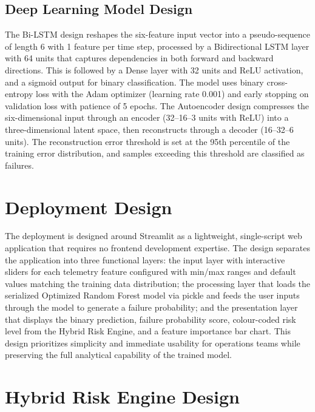 \documentclass[12pt,letterpaper]{report}
\begin{document}
\subsection{Deep Learning Model Design}

The Bi-LSTM design reshapes the six-feature input vector into a pseudo-sequence of length 6 with 1 feature per time step, processed by a Bidirectional LSTM layer with 64 units that captures dependencies in both forward and backward directions. This is followed by a Dense layer with 32 units and ReLU activation, and a sigmoid output for binary classification. The model uses binary cross-entropy loss with the Adam optimizer (learning rate 0.001) and early stopping on validation loss with patience of 5 epochs. The Autoencoder design compresses the six-dimensional input through an encoder (32--16--3 units with ReLU) into a three-dimensional latent space, then reconstructs through a decoder (16--32--6 units). The reconstruction error threshold is set at the 95th percentile of the training error distribution, and samples exceeding this threshold are classified as failures.

\section{Deployment Design}

The deployment is designed around Streamlit as a lightweight, single-script web application that requires no frontend development expertise. The design separates the application into three functional layers: the input layer with interactive sliders for each telemetry feature configured with min/max ranges and default values matching the training data distribution; the processing layer that loads the serialized Optimized Random Forest model via pickle and feeds the user inputs through the model to generate a failure probability; and the presentation layer that displays the binary prediction, failure probability score, colour-coded risk level from the Hybrid Risk Engine, and a feature importance bar chart. This design prioritizes simplicity and immediate usability for operations teams while preserving the full analytical capability of the trained model.

\section{Hybrid Risk Engine Design}
\end{document}
